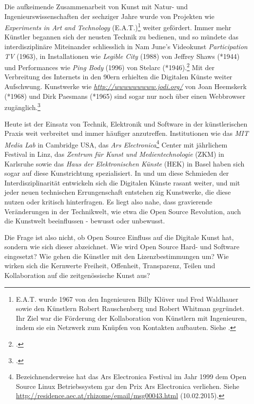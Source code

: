 \documentclass[
paper=164mm:234mm, %
pagesize, %
DIV=calc, %
10pt, %
BCOR=0mm, %
parskip=half- %
]{scrbook}
\begin{document}
Die aufkeimende Zusammenarbeit von Kunst mit Natur- und Ingenieurswissenschaften der sechziger Jahre wurde von Projekten wie \emph{Experiments in Art and Technology} (E.A.T.)\footnote{E.A.T. wurde 1967 von den Ingenieuren Billy Klüver und Fred Waldhauer sowie den Künstlern Robert Rauschenberg und Robert Whitman gegründet. Ihr Ziel war die Förderung der Kollaboration von Künstlern mit Ingenieuren, indem sie ein Netzwerk zum Knüpfen von Kontakten aufbauten. Siehe \cite[16]{Paul:2003}.} weiter gefördert. Immer mehr Künstler begannen sich der neusten Technik zu bedienen, und so mündete das interdisziplinäre Miteinander schliesslich in Nam June's Videokunst \emph{Participation TV} (1963), in Installationen wie \emph{Legible City} (1988) von Jeffrey Shaws (*1944) und Performances wie \emph{Ping Body} (1996) von Stelarc (*1946).\footnote{\cite[96]{Graham:2007}.} Mit der Verbreitung des Internets in den 90ern erhielten die Digitalen Künste weiter Aufschwung. Kunstwerke wie \emph{\url{http://wwwwwwwww.jodi.org/}} von Joan Heemskerk (*1968) und Dirk Paesmans (*1965) sind sogar nur noch über einen Webbrowser zugänglich.\footnote{\cite[128]{Hope-Ryan:2014}.}

Heute ist der Einsatz von Technik, Elektronik und Software in der künstlerischen Praxis weit verbreitet und immer häufiger anzutreffen. Institutionen wie das \emph{MIT Media Lab} in Cambridge USA, das \emph{Ars Electronica}\footnote{Bezeichnenderweise hat das Ars Electronica Festival im Jahr 1999 dem Open Source Linux Betriebssystem gar den Prix Ars Electronica verliehen. Siehe \url{http://residence.aec.at/rhizome/email/msg00043.html} (10.02.2015).} Center mit jährlichem Festival in Linz, das \emph{Zentrum für Kunst und Medientechnologie} (ZKM) in Karlsruhe sowie das \emph{Haus der Elektronischen Künste} (HEK) in Basel haben sich sogar auf diese Kunstrichtung spezialisiert. In und um diese Schmieden der Interdisziplinarität entwickeln sich die Digitalen Künste rasant weiter, und mit jeder neuen technischen Errungenschaft entstehen zig Kunstwerke, die diese nutzen oder kritisch hinterfragen. Es liegt also nahe, dass gravierende Veränderungen in der Technikwelt, wie etwa die Open Source Revolution, auch die Kunstwelt beeinflussen - bewusst oder unbewusst.

Die Frage ist also nicht, ob Open Source Einfluss auf die Digitale Kunst hat, sondern wie sich dieser abzeichnet. Wie wird Open Source Hard- und Software eingesetzt? Wie gehen die Künstler mit den Lizenzbestimmungen um? Wie wirken sich die Kernwerte Freiheit, Offenheit, Transparenz, Teilen und Kollaboration auf die zeitgenössische Kunst aus?
\end{document}
